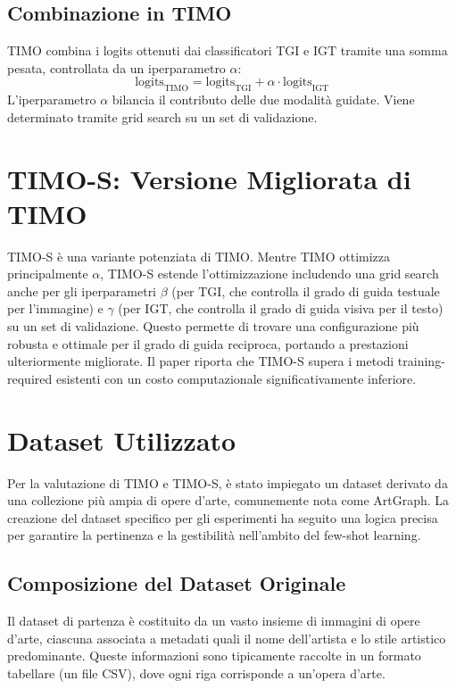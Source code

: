 \documentclass[11pt,a4paper]{article}
\begin{document}
\subsection{Combinazione in TIMO}
TIMO combina i logits ottenuti dai classificatori TGI e IGT tramite una somma pesata, controllata da un iperparametro $\alpha$:
\[ \text{logits}_{\text{TIMO}} = \text{logits}_{\text{TGI}} + \alpha \cdot \text{logits}_{\text{IGT}} \]
L'iperparametro $\alpha$ bilancia il contributo delle due modalità guidate. Viene determinato tramite grid search su un set di validazione.

\section{TIMO-S: Versione Migliorata di TIMO}
TIMO-S è una variante potenziata di TIMO. Mentre TIMO ottimizza principalmente $\alpha$, TIMO-S estende l'ottimizzazione includendo una grid search anche per gli iperparametri $\beta$ (per TGI, che controlla il grado di guida testuale per l'immagine) e $\gamma$ (per IGT, che controlla il grado di guida visiva per il testo) su un set di validazione.
Questo permette di trovare una configurazione più robusta e ottimale per il grado di guida reciproca, portando a prestazioni ulteriormente migliorate. Il paper riporta che TIMO-S supera i metodi training-required esistenti con un costo computazionale significativamente inferiore.

\section{Dataset Utilizzato}
\label{sec:dataset}
Per la valutazione di TIMO e TIMO-S, è stato impiegato un dataset derivato da una collezione più ampia di opere d'arte, comunemente nota come ArtGraph. La creazione del dataset specifico per gli esperimenti ha seguito una logica precisa per garantire la pertinenza e la gestibilità nell'ambito del few-shot learning.

\subsection{Composizione del Dataset Originale}
Il dataset di partenza è costituito da un vasto insieme di immagini di opere d'arte, ciascuna associata a metadati quali il nome dell'artista e lo stile artistico predominante. Queste informazioni sono tipicamente raccolte in un formato tabellare (un file CSV), dove ogni riga corrisponde a un'opera d'arte.
\end{document}

